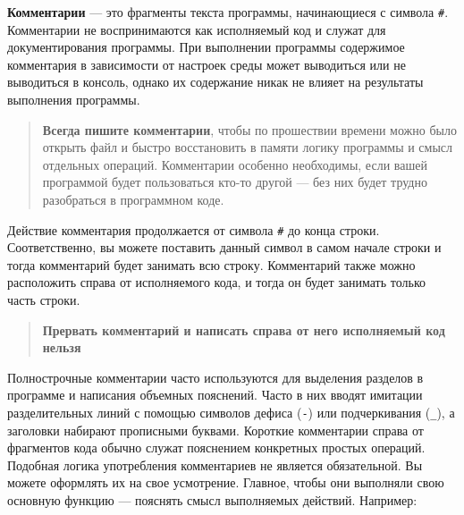 \documentclass[]{book}
\newenvironment{Shaded}{\begin{snugshade}}{\end{snugshade}}
\newcommand{\DecValTok}[1]{\textcolor[rgb]{0.00,0.00,0.81}{#1}}
\newcommand{\StringTok}[1]{\textcolor[rgb]{0.31,0.60,0.02}{#1}}
\newcommand{\CommentTok}[1]{\textcolor[rgb]{0.56,0.35,0.01}{\textit{#1}}}
\newcommand{\OperatorTok}[1]{\textcolor[rgb]{0.81,0.36,0.00}{\textbf{#1}}}
\newcommand{\NormalTok}[1]{#1}
\begin{document}
\textbf{Комментарии} --- это фрагменты текста программы, начинающиеся с
символа \texttt{\#}. Комментарии не воспринимаются как исполняемый код и
служат для документирования программы. При выполнении программы
содержимое комментария в зависимости от настроек среды может выводиться
или не выводиться в консоль, однако их содержание никак не влияет на
результаты выполнения программы.

\begin{quote}
\textbf{Всегда пишите комментарии}, чтобы по прошествии времени можно
было открыть файл и быстро восстановить в памяти логику программы и
смысл отдельных операций. Комментарии особенно необходимы, если вашей
программой будет пользоваться кто-то другой --- без них будет трудно
разобраться в программном коде.
\end{quote}

Действие комментария продолжается от символа \texttt{\#} до конца
строки. Соответственно, вы можете поставить данный символ в самом начале
строки и тогда комментарий будет занимать всю строку. Комментарий также
можно расположить справа от исполняемого кода, и тогда он будет занимать
только часть строки.

\begin{quote}
\textbf{Прервать комментарий и написать справа от него исполняемый код
нельзя}
\end{quote}

Полнострочные комментарии часто используются для выделения разделов в
программе и написания объемных пояснений. Часто в них вводят имитации
разделительных линий с помощью символов дефиса (\texttt{-}) или
подчеркивания (\texttt{\_}), а заголовки набирают прописными буквами.
Короткие комментарии справа от фрагментов кода обычно служат пояснением
конкретных простых операций. Подобная логика употребления комментариев
не является обязательной. Вы можете оформлять их на свое усмотрение.
Главное, чтобы они выполняли свою основную функцию --- пояснять смысл
выполняемых действий. Например:

\begin{Shaded}
\end{Shaded}
\end{document}
